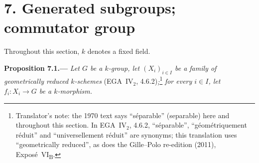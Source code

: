 
\section*{7. Generated subgroups; commutator group}
\label{sec:sga3-VIB-7}%

Throughout this section, \(k\) denotes a fixed field.

\medskip
{}\label{prop:sga3-VIB-7.1}%
\noindent\textbf{Proposition 7.1.---}
\emph{Let \(G\) be a \(k\)-group, let
\((X_i)_{i\in I}\) be a family of geometrically reduced
\(k\)-schemes} \textup{(EGA~IV\(_2\), 4.6.2)}\emph{;}\footnote{Translator's note: the 1970 text says ``séparable''
(separable) here and throughout this section. In EGA~IV\(_2\), 4.6.2, ``séparable'', ``géométriquement
réduit'' and ``universellement réduit'' are synonyms; this translation uses ``geometrically reduced'', as does
the Gille--Polo re-edition (2011), Exposé~VI\textsubscript{B}.}
\emph{for every \(i\in I\), let \(f_i:X_i\to G\) be a
\(k\)-morphism.}
